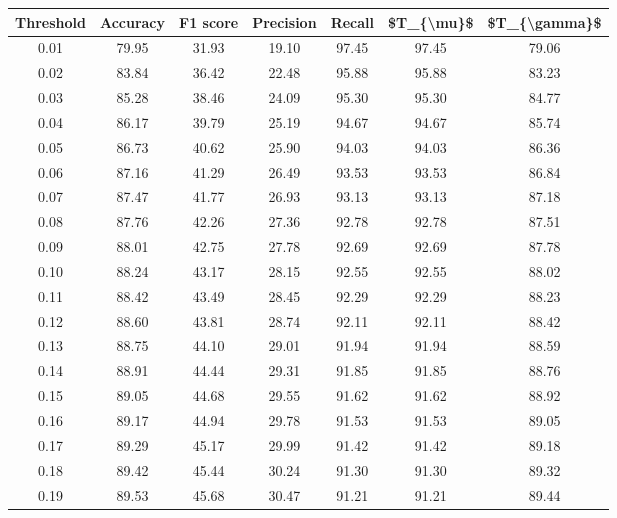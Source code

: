 \begin{tabular}{|c|c|c|c|c|c|c|}
\hline
 Threshold &  Accuracy &  F1 score &  Precision &  Recall &  \$T\_\{\textbackslash mu\}\$ &  \$T\_\{\textbackslash gamma\}\$ \\
\hline
      0.01 &     79.95 &     31.93 &      19.10 &   97.45 &      97.45 &         79.06 \\
      0.02 &     83.84 &     36.42 &      22.48 &   95.88 &      95.88 &         83.23 \\
      0.03 &     85.28 &     38.46 &      24.09 &   95.30 &      95.30 &         84.77 \\
      0.04 &     86.17 &     39.79 &      25.19 &   94.67 &      94.67 &         85.74 \\
      0.05 &     86.73 &     40.62 &      25.90 &   94.03 &      94.03 &         86.36 \\
      0.06 &     87.16 &     41.29 &      26.49 &   93.53 &      93.53 &         86.84 \\
      0.07 &     87.47 &     41.77 &      26.93 &   93.13 &      93.13 &         87.18 \\
      0.08 &     87.76 &     42.26 &      27.36 &   92.78 &      92.78 &         87.51 \\
      0.09 &     88.01 &     42.75 &      27.78 &   92.69 &      92.69 &         87.78 \\
      0.10 &     88.24 &     43.17 &      28.15 &   92.55 &      92.55 &         88.02 \\
      0.11 &     88.42 &     43.49 &      28.45 &   92.29 &      92.29 &         88.23 \\
      0.12 &     88.60 &     43.81 &      28.74 &   92.11 &      92.11 &         88.42 \\
      0.13 &     88.75 &     44.10 &      29.01 &   91.94 &      91.94 &         88.59 \\
      0.14 &     88.91 &     44.44 &      29.31 &   91.85 &      91.85 &         88.76 \\
      0.15 &     89.05 &     44.68 &      29.55 &   91.62 &      91.62 &         88.92 \\
      0.16 &     89.17 &     44.94 &      29.78 &   91.53 &      91.53 &         89.05 \\
      0.17 &     89.29 &     45.17 &      29.99 &   91.42 &      91.42 &         89.18 \\
      0.18 &     89.42 &     45.44 &      30.24 &   91.30 &      91.30 &         89.32 \\
      0.19 &     89.53 &     45.68 &      30.47 &   91.21 &      91.21 &         89.44 \\

\end{tabular}
